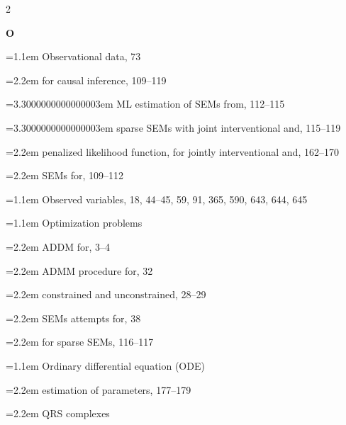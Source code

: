 \begin{multicols}{2}
\par{}\medskip\noindent\textbf{O}\par\nobreak\smallskip\nobreak
\noindent\hangindent=1.1em Observational data, 73\par
\noindent\hangindent=2.2em \hspace*{1.1em}for causal inference, 109--119\par
\noindent\hangindent=3.3000000000000003em \hspace*{2.2em}ML estimation of SEMs from, 112--115\par
\noindent\hangindent=3.3000000000000003em \hspace*{2.2em}sparse SEMs with joint interventional and, 115--119\par
\noindent\hangindent=2.2em \hspace*{1.1em}penalized likelihood function, for jointly interventional and, 162--170\par
\noindent\hangindent=2.2em \hspace*{1.1em}SEMs for, 109--112\par
\noindent\hangindent=1.1em Observed variables, 18, 44--45, 59, 91, 365, 590, 643, 644, 645\par
\noindent\hangindent=1.1em Optimization problems\par
\noindent\hangindent=2.2em \hspace*{1.1em}ADDM for, 3--4\par
\noindent\hangindent=2.2em \hspace*{1.1em}ADMM procedure for, 32\par
\noindent\hangindent=2.2em \hspace*{1.1em}constrained and unconstrained, 28--29\par
\noindent\hangindent=2.2em \hspace*{1.1em}SEMs attempts for, 38\par
\noindent\hangindent=2.2em \hspace*{1.1em}for sparse SEMs, 116--117\par
\noindent\hangindent=1.1em Ordinary differential equation (ODE)\par
\noindent\hangindent=2.2em \hspace*{1.1em}estimation of parameters, 177--179\par
\noindent\hangindent=2.2em \hspace*{1.1em}QRS complexes\par

\end{multicols}
